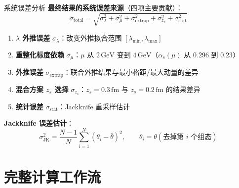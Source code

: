 \documentclass[10pt,aspectratio=169]{beamer}
\newcommand{\alphas}{\alpha_s}
\newcommand{\GeV}{\,\mathrm{GeV}}
\newcommand{\fm}{\,\mathrm{fm}}
\begin{document}
\begin{frame}{系统误差分析}
\small
\textbf{最终结果的系统误差来源}（四项主要贡献）：
\begin{equation}
  \boxed{
  \sigma_{\text{total}} = \sqrt{
  \sigma_{\lambda}^2 + \sigma_{\mu}^2 + \sigma_{\text{extrap}}^2 + \sigma_{z_s}^2 + \sigma_{\text{stat}}^2
  }
  }
\end{equation}

\begin{enumerate}
  \item[(1)] \textbf{$\lambda$ 外推误差} $\sigma_{\lambda}$：改变外推拟合范围 $[\lambda_{\min}, \lambda_{\max}]$
  \item[(2)] \textbf{重整化标度依赖} $\sigma_{\mu}$：$\mu$ 从 $2\GeV$ 变到 $4\GeV$（$\alphas(\mu)$ 从 $0.296$ 到 $0.23$）
  \item[(3)] \textbf{外推误差} $\sigma_{\text{extrap}}$：联合外推结果与最小格距/最大动量的差异
  \item[(4)] \textbf{混合方案 $z_s$ 选择} $\sigma_{z_s}$：$z_s=0.3\fm$ 与 $z_s=0.2\fm$ 的结果差异
  \item[(5)] \textbf{统计误差} $\sigma_{\text{stat}}$：Jackknife 重采样估计
\end{enumerate}

\textbf{Jackknife 误差估计}：
\begin{equation}
  \sigma_{\text{JK}}^2 = \frac{N-1}{N}\sum_{i=1}^{N} (\theta_i - \bar{\theta})^2,\qquad
  \theta_i = \theta(\text{去掉第 }i\text{ 个组态})
\end{equation}
\end{frame}

\section{完整计算工作流}
\end{document}
